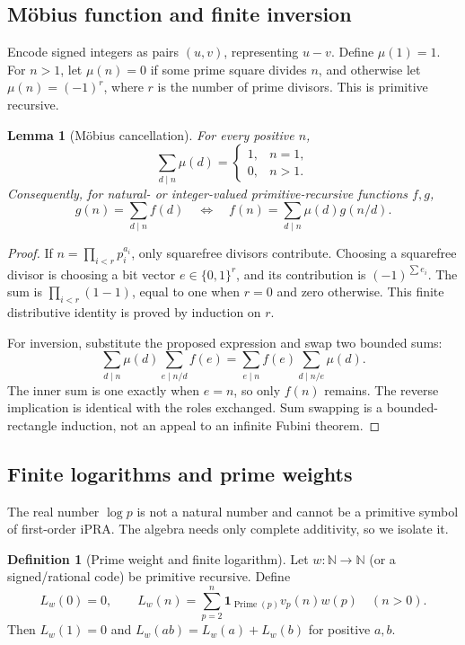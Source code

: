 \documentclass[11pt]{article}
\newtheorem{lemma}[theorem]{Lemma}
\theoremstyle{definition}
\newtheorem{definition}[theorem]{Definition}
\newcommand{\N}{\mathbb N}
\newcommand{\ipra}{\mathrm{iPRA}}
\newcommand{\Prime}{\operatorname{Prime}}
\newcommand{\ind}[1]{\mathbf 1_{#1}}
\begin{document}
\subsection{M\"obius function and finite inversion}

Encode signed integers as pairs \((u,v)\), representing \(u-v\).  Define
\(\mu(1)=1\).  For \(n>1\), let \(\mu(n)=0\) if some prime square divides
\(n\), and otherwise let \(\mu(n)=(-1)^r\), where \(r\) is the number of
prime divisors.  This is primitive recursive.

\begin{lemma}[M\"obius cancellation]\label{lem:mobius-cancel}
For every positive \(n\),
\[
 \sum_{d\mid n}\mu(d)=\begin{cases}1,&n=1,\\0,&n>1.
 \end{cases}
\]
Consequently, for natural- or integer-valued primitive-recursive functions
\(f,g\),
\[
 g(n)=\sum_{d\mid n}f(d)
 \quad\Longleftrightarrow\quad
 f(n)=\sum_{d\mid n}\mu(d)g(n/d).
\]
\end{lemma}

\begin{proof}
If \(n=\prod_{i<r}p_i^{a_i}\), only squarefree divisors contribute.  Choosing
a squarefree divisor is choosing a bit vector \(e\in\{0,1\}^r\), and its
contribution is \((-1)^{\sum e_i}\).  The sum is
\(\prod_{i<r}(1-1)\), equal to one when \(r=0\) and zero otherwise.  This
finite distributive identity is proved by induction on \(r\).

For inversion, substitute the proposed expression and swap two bounded sums:
\[
 \sum_{d\mid n}\mu(d)\sum_{e\mid n/d}f(e)
 =\sum_{e\mid n}f(e)\sum_{d\mid n/e}\mu(d).
\]
The inner sum is one exactly when \(e=n\), so only \(f(n)\) remains.  The
reverse implication is identical with the roles exchanged.  Sum swapping is a
bounded-rectangle induction, not an appeal to an infinite Fubini theorem.
\end{proof}

\subsection{Finite logarithms and prime weights}

The real number \(\log p\) is not a natural number and cannot be a primitive
symbol of first-order \(\ipra\).  The algebra needs only complete additivity,
so we isolate it.

\begin{definition}[Prime weight and finite logarithm]\label{def:weight}
Let \(w:\N\to\N\) (or a signed/rational code) be primitive recursive.  Define
\[
 L_w(0)=0,
 \qquad
 L_w(n)=\sum_{p=2}^{n}\ind{\Prime(p)}v_p(n)w(p)
 \quad(n>0).
\]
Then \(L_w(1)=0\) and \(L_w(ab)=L_w(a)+L_w(b)\) for positive \(a,b\).
\end{definition}
\end{document}
